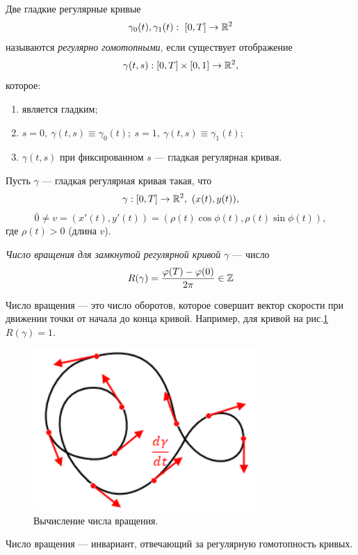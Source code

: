 \begin{definition}
    Две гладкие регулярные кривые $$\gamma_0(t), \gamma_1(t): \ [0, T] \to \mathbb{R}^2$$ называются \textit{регулярно гомотопными}, если существует отображение $$\gamma(t,s): [0, T] \times [0,1] \to \mathbb{R}^2,$$ которое:
    \begin{enumerate}
        \item является гладким;
        \item $s = 0, \ \gamma(t,s) \equiv \gamma_0(t); \ s = 1,\ \gamma(t,s) \equiv \gamma_1(t)$;
        \item $\gamma(t,s)$ при фиксированном $s$ — гладкая регулярная кривая.
    \end{enumerate}
\end{definition} 


Пусть $\gamma$ — гладкая регулярная кривая такая, что $$\gamma: [0, T] \to \mathbb{R}^2,\ (x(t), y(t)),$$ $$\bar{0} \neq v = (x'(t), y'(t)) = (\rho(t) \cos{\phi(t)}, \rho(t) \sin{\phi(t)}),$$ где $\rho(t) > 0$ (длина $v$).

\begin{definition}
    \textit{Число вращения для замкнутой регулярной кривой $\gamma$} — число $$R(\gamma) = \frac{\varphi(T) - \varphi(0)}{2 \pi} \in \mathbb{Z}$$
\end{definition}

\begin{remark}
    Число вращения — это число оборотов, которое совершит вектор скорости при движении точки от начала до конца кривой.
    Например, для кривой на рис.\ref{fig:c12.5} $R(\gamma) = 1$.
    \begin{figure}[htbp]
        \centering
        \includegraphics[scale=0.7]{images/c12.5.png}
        \caption{Вычисление числа вращения.}
        \label{fig:c12.5}
    \end{figure}
\end{remark}

\begin{remark}
    Число вращения — инвариант, отвечающий за регулярную гомотопность кривых.
\end{remark}

